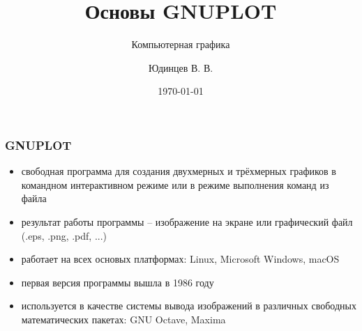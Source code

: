 \documentclass[12pt, compress]{beamer}
\title[Основы GNUPLOT]{Основы GNUPLOT}
\subtitle{Компьютерная графика}
\author[Кафедра теоретической механики]{Юдинцев В. В.}
\institute{Кафедра теоретической механики}
\date{\today}
\renewcommand{\emph}[1]{\textcolor{dark-blue}{#1}}
\begin{document}
{
\begin{frame}[plain]
\maketitle
\end{frame}
}

%
%

\begin{frame}[c]
\frametitle{GNUPLOT}
\begin{itemize}
\item \emph{свободная} программа для создания двухмерных и трёхмерных графиков в командном интерактивном режиме или в режиме выполнения команд из файла
\item результат работы программы -- изображение на экране или графический файл (.eps, .png, .pdf, ...)
\item работает на всех основых платформах: Linux, Microsoft Windows, macOS
\item первая версия программы вышла в 1986 году
\item используется в качестве системы вывода изображений в различных свободных математических пакетах: GNU Octave, Maxima
\end{itemize}
\end{frame}
\end{document}
